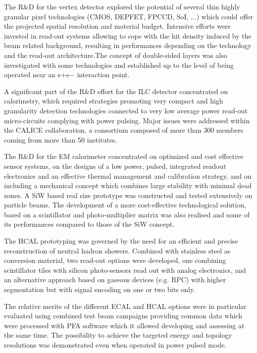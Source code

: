 \documentclass[%
 reprint,
 amsmath,amssymb,
 aps,
]{revtex4-1}
\begin{document}
The R\&D for the vertex detector explored the potential of several thin highly granular pixel technologies (CMOS, DEPFET, FPCCD, SoI, ...) which could offer the projected spatial resolution and material budget. Intensive efforts were invested in read-out systems allowing to cope with the hit density induced by the beam related background, resulting in performances depending on the technology and the read-out architecture.The concept of double-sided layers was also investigated with some technologies and established up to the level of being operated near an e+e− interaction point.

A significant part of the R\&D effort for the ILC detector concentrated on calorimetry, which required strategies promoting very compact and high granularity detection technologies connected to very low average power read-out micro-circuits complying with power pulsing. Major issues were addressed within the CALICE collaboration, a consortium composed of more than 300 members coming from more than 50 institutes.

The R\&D for the EM calorimeter concentrated on optimized and cost effective sensor systems, on the designs of a low power, pulsed, integrated readout electronics and an effective thermal management and calibration strategy, and on including a mechanical concept which combines large stability with minimal dead zones. A SiW based real size prototype was constructed and tested extensively on particle beams. The development of a more cost-effective technological solution, based on a scintillator and photo-multiplier matrix was also realised and some of its performances compared to those of the SiW concept.

The HCAL prototyping was governed by the need for an efficient and precise reconstruction of neutral hadron showers. Combined with stainless steel as conversion material, two read-out options were developed, one combining scintillator tiles with silicon photo-sensors read out with analog electronics, and an alternative approach based on gaseous devices (e.g. RPC) with higher segmentation but with signal encoding on one or two bits only.

The relative merits of the different ECAL and HCAL options were in particular evaluated using combined test beam campaigns providing common data which were processed with PFA software which it allowed developing and assessing at the same time. The possibility to achieve the targeted energy and topology resolutions was demonstrated even when operated in power pulsed mode.
\end{document}
